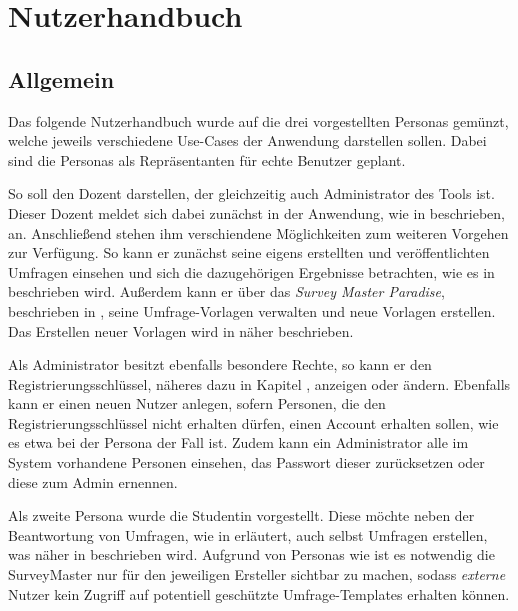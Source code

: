 
\section{Nutzerhandbuch} %
\label{sec:Nutzerhandbuch}

\subsection{Allgemein}

Das folgende Nutzerhandbuch wurde auf die drei vorgestellten Personas gemünzt, welche jeweils verschiedene Use-Cases der Anwendung darstellen sollen.
Dabei sind die Personas als Repräsentanten für echte Benutzer geplant.

So soll \duzi den Dozent darstellen, der gleichzeitig auch Administrator des Tools ist.
Dieser Dozent meldet sich dabei zunächst in der Anwendung, wie in  beschrieben, an.
Anschließend stehen ihm verschiendene Möglichkeiten zum weiteren Vorgehen zur Verfügung.
So kann er zunächst seine eigens erstellten und veröffentlichten Umfragen einsehen und sich die dazugehörigen Ergebnisse betrachten, wie es in  beschrieben wird.
Außerdem kann er über das \emph{Survey Master Paradise}, beschrieben in , seine Umfrage-Vorlagen verwalten und neue Vorlagen erstellen.
Das Erstellen neuer Vorlagen wird in  näher beschrieben.

Als Administrator besitzt \duzi ebenfalls besondere Rechte, so kann er den Registrierungsschlüssel, näheres dazu in Kapitel , anzeigen oder ändern.
Ebenfalls kann er einen neuen Nutzer anlegen, sofern Personen, die den Registrierungsschlüssel nicht erhalten dürfen, einen Account erhalten sollen, wie es etwa bei der Persona \ariane der Fall ist. 
Zudem kann ein Administrator alle im System vorhandene Personen einsehen, das Passwort dieser zurücksetzen oder diese zum Admin ernennen.

Als zweite Persona wurde die Studentin \ariane vorgestellt.
Diese möchte neben der Beantwortung von Umfragen, wie in  erläutert, auch selbst Umfragen erstellen, was näher in  beschrieben wird.
Aufgrund von Personas wie \ariane ist es notwendig die SurveyMaster nur für den jeweiligen Ersteller sichtbar zu machen, sodass \textit{externe} Nutzer kein Zugriff auf potentiell geschützte Umfrage-Templates erhalten können.

